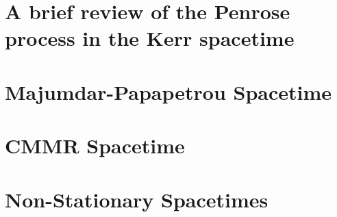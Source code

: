 

\section{A brief review of the Penrose process in the Kerr spacetime}
\label{ch:penrose_binaries:sec:penrose_review}


\section{Majumdar-Papapetrou Spacetime}
\label{ch:penrose_binaries:sec:mp_penrose}


\section{CMMR Spacetime}
\label{ch:penrose_binaries:sec:cmmr_penrose}


\section{Non-Stationary Spacetimes}
\label{ch:penrose_binaries:sec:arbitrary_penrose}

